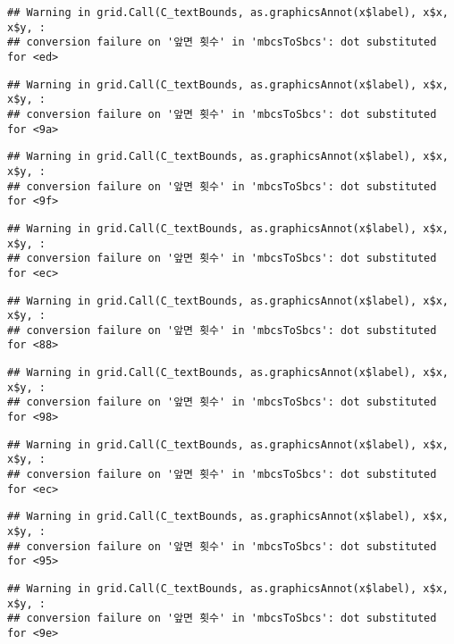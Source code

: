 \documentclass[]{book}
\begin{document}
\begin{verbatim}
## Warning in grid.Call(C_textBounds, as.graphicsAnnot(x$label), x$x, x$y, :
## conversion failure on '앞면 횟수' in 'mbcsToSbcs': dot substituted for <ed>
\end{verbatim}

\begin{verbatim}
## Warning in grid.Call(C_textBounds, as.graphicsAnnot(x$label), x$x, x$y, :
## conversion failure on '앞면 횟수' in 'mbcsToSbcs': dot substituted for <9a>
\end{verbatim}

\begin{verbatim}
## Warning in grid.Call(C_textBounds, as.graphicsAnnot(x$label), x$x, x$y, :
## conversion failure on '앞면 횟수' in 'mbcsToSbcs': dot substituted for <9f>
\end{verbatim}

\begin{verbatim}
## Warning in grid.Call(C_textBounds, as.graphicsAnnot(x$label), x$x, x$y, :
## conversion failure on '앞면 횟수' in 'mbcsToSbcs': dot substituted for <ec>
\end{verbatim}

\begin{verbatim}
## Warning in grid.Call(C_textBounds, as.graphicsAnnot(x$label), x$x, x$y, :
## conversion failure on '앞면 횟수' in 'mbcsToSbcs': dot substituted for <88>
\end{verbatim}

\begin{verbatim}
## Warning in grid.Call(C_textBounds, as.graphicsAnnot(x$label), x$x, x$y, :
## conversion failure on '앞면 횟수' in 'mbcsToSbcs': dot substituted for <98>
\end{verbatim}

\begin{verbatim}
## Warning in grid.Call(C_textBounds, as.graphicsAnnot(x$label), x$x, x$y, :
## conversion failure on '앞면 횟수' in 'mbcsToSbcs': dot substituted for <ec>
\end{verbatim}

\begin{verbatim}
## Warning in grid.Call(C_textBounds, as.graphicsAnnot(x$label), x$x, x$y, :
## conversion failure on '앞면 횟수' in 'mbcsToSbcs': dot substituted for <95>
\end{verbatim}

\begin{verbatim}
## Warning in grid.Call(C_textBounds, as.graphicsAnnot(x$label), x$x, x$y, :
## conversion failure on '앞면 횟수' in 'mbcsToSbcs': dot substituted for <9e>
\end{verbatim}
\end{document}
